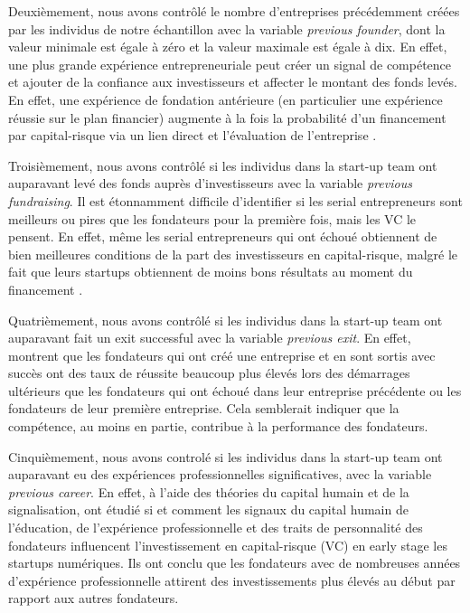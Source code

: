 \documentclass[12pt]{article}
\begin{document}
Deuxièmement, nous avons contrôlé le nombre d'entreprises précédemment créées par les individus de notre échantillon avec la variable \textit{previous founder}, dont la valeur minimale est égale à zéro et la valeur maximale est égale à dix. En effet, une plus grande expérience entrepreneuriale peut créer un signal de compétence et ajouter de la confiance aux investisseurs et affecter le montant des fonds levés. En effet, une expérience de fondation antérieure (en particulier une expérience réussie sur le plan financier) augmente à la fois la probabilité d'un financement par capital-risque via un lien direct et l'évaluation de l'entreprise \citep{hsu2007experienced}.

Troisièmement, nous avons contrôlé si les individus dans la start-up team ont auparavant levé des fonds auprès d'investisseurs avec la variable \textit{previous fundraising}. Il est étonnamment difficile d'identifier si les serial entrepreneurs sont meilleurs ou pires que les fondateurs pour la première fois, mais les VC le pensent. En effet, même les serial entrepreneurs qui ont échoué obtiennent de bien meilleures conditions de la part des investisseurs en capital-risque, malgré le fait que leurs startups obtiennent de moins bons résultats au moment du financement \citep{nahata2019success}.

Quatrièmement, nous avons contrôlé si les individus dans la start-up team ont auparavant fait un exit successful avec la variable \textit{previous exit}. En effet, \citet{gompers2010performance} montrent que les fondateurs qui ont créé une entreprise et en sont sortis avec succès ont des taux de réussite beaucoup plus élevés lors des démarrages ultérieurs que les fondateurs qui ont échoué dans leur entreprise précédente ou les fondateurs de leur première entreprise. Cela semblerait indiquer que la compétence, au moins en partie, contribue à la performance des fondateurs.

Cinquièmement, nous avons controlé si les individus dans la start-up team ont auparavant eu des expériences professionnelles significatives, avec la variable \textit{previous career}. En effet, à l'aide des théories du capital humain et de la signalisation, \citet{subramanian2022backing} ont étudié si et comment les signaux du capital humain de l'éducation, de l'expérience professionnelle et des traits de personnalité des fondateurs influencent l'investissement en capital-risque (VC) en early stage les startups numériques. Ils ont conclu que les fondateurs avec de nombreuses années d'expérience professionnelle attirent des investissements plus élevés au début par rapport aux autres fondateurs.
\end{document}
